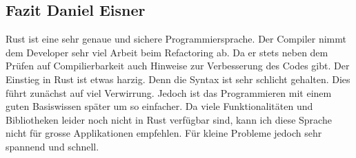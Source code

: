 \subsection{Fazit Daniel Eisner}
Rust ist eine sehr genaue und sichere Programmiersprache. Der Compiler nimmt dem Developer sehr viel Arbeit beim Refactoring ab. Da er stets neben dem Prüfen auf Compilierbarkeit auch Hinweise zur Verbesserung des Codes gibt. Der Einstieg in Rust ist etwas harzig. Denn die Syntax ist sehr schlicht gehalten. Dies führt zunächst auf viel Verwirrung. Jedoch ist das Programmieren mit einem guten Basiswissen später um so einfacher. Da viele Funktionalitäten und Bibliotheken leider noch nicht in Rust verfügbar sind, kann ich diese Sprache nicht für grosse Applikationen empfehlen. Für kleine Probleme jedoch sehr spannend und schnell.